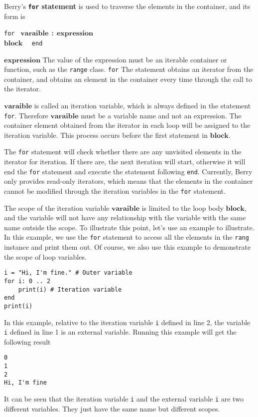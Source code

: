 Berry’s \textbf{\texttt{for} statement} is used to traverse the elements in the container, and its form is
\begin{algorithm}
    \texttt{for } $\bm{varaible}$ \texttt{:} $\bm{expression}$ \\
        \qquad $\bm{block}$ \ \
    \texttt{end}
\end{algorithm}\vspace{-0.6em}

$\bm{expression}$ The value of the expression must be an iterable container or function, such as the \texttt{range} class. \texttt{for} The statement obtains an iterator from the container, and obtains an element in the container every time through the call to the iterator.

$\bm{varaible}$ is called an iteration variable, which is always defined in the statement \texttt{for}. Therefore $\bm{varaible}$ must be a variable name and not an expression. The container element obtained from the iterator in each loop will be assigned to the iteration variable. This process occurs before the first statement in $\bm{block}$.

The \texttt{for} statement will check whether there are any unvisited elements in the iterator for iteration. If there are, the next iteration will start, otherwise it will end the \texttt{for} statement and execute the statement following \texttt{end}. Currently, Berry only provides read-only iterators, which means that the elements in the container cannot be modified through the iteration variables in the \texttt{for} statement.

The scope of the iteration variable $\bm{varaible}$ is limited to the loop body $\bm{block}$, and the variable will not have any relationship with the variable with the same name outside the scope. To illustrate this point, let's use an example to illustrate. In this example, we use the \texttt{for} statement to access all the elements in the \texttt{rang} instance and print them out. Of course, we also use this example to demonstrate the scope of loop variables.
\begin{lstlisting}[language=berry]
i = "Hi, I'm fine." # Outer variable
for i: 0 .. 2
    print(i) # Iteration variable
end
print(i)
\end{lstlisting}

In this example, relative to the iteration variable \texttt{i} defined in line 2, the variable \texttt{i} defined in line 1 is an external variable. Running this example will get the following result
\begin{lstlisting}[numbers=none]
0
1
2
Hi, I'm fine
\end{lstlisting}
It can be seen that the iteration variable \texttt{i} and the external variable \texttt{i} are two different variables. They just have the same name but different scopes.

